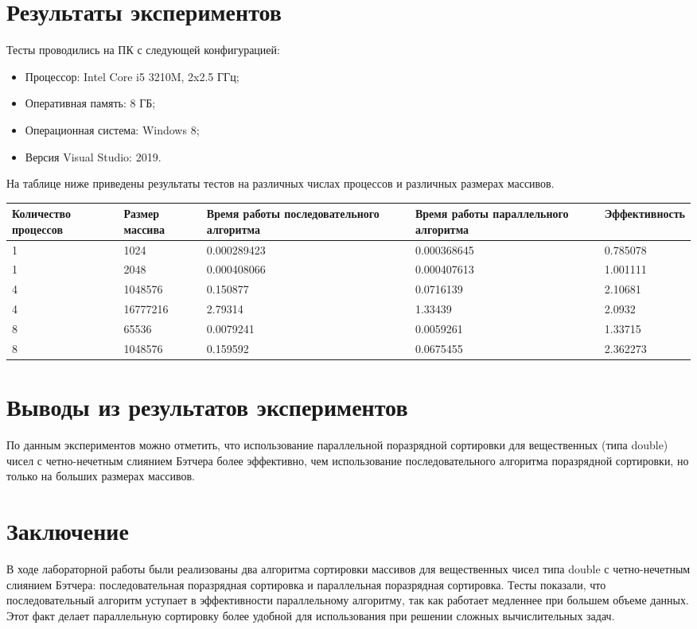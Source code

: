 \documentclass{report}
\begin{document}
\section*{Результаты экспериментов}
Тесты проводились на ПК с следующей конфигурацией:
\begin{itemize}
\item Процессор: Intel Core i5 3210M, 2x2.5 ГГц;
\item Оперативная память: 8 ГБ;
\item Операционная система: Windows 8;
\item Версия Visual Studio: 2019.
\end{itemize}
На таблице ниже приведены результаты тестов на различных числах процессов и различных размерах массивов.
\begin{table}[!h]
\begin{tabular}{| p{2cm} | p{2cm} | p{3cm} | p{3cm} | p{3cm} |}
\hline
Количество процессов & Размер массива & Время работы последовательного алгоритма & Время работы параллельного алгоритма & Эффективность  \\[5pt]
\hline
1 &   1024    & 0.000289423        & 0.000368645     & 0.785078       \\
1  & 2048     & 0.000408066        & 0.000407613     & 1.001111       \\
4    & 1048576    & 0.150877        & 0.0716139     & 2.10681       \\
4   &  16777216   & 2.79314        & 1.33439     & 2.0932      \\
8    & 65536   & 0.0079241        & 0.0059261     & 1.33715       \\
8   &  1048576   & 0.159592        & 0.0675455     & 2.362273       \\
\hline
\end{tabular}
\end{table}
\newpage
\section*{Выводы из результатов экспериментов}
По данным экспериментов можно отметить, что использование параллельной поразрядной
сортировки для вещественных (типа double) чисел с четно-нечетным слиянием Бэтчера более эффективно, чем использование последовательного алгоритма поразрядной сортировки, но только на больших размерах массивов.
\newpage
\section*{Заключение}
В ходе лабораторной работы были реализованы два алгоритма сортировки массивов для вещественных чисел типа double с четно-нечетным слиянием Бэтчера:
последовательная поразрядная сортировка и параллельная поразрядная сортировка. Тесты показали, что последовательный алгоритм уступает в эффективности параллельному алгоритму, так как работает медленнее при большем объеме данных. Этот факт делает параллельную сортировку более удобной для использования при решении сложных вычислительных задач.
\newpage
\end{document}
